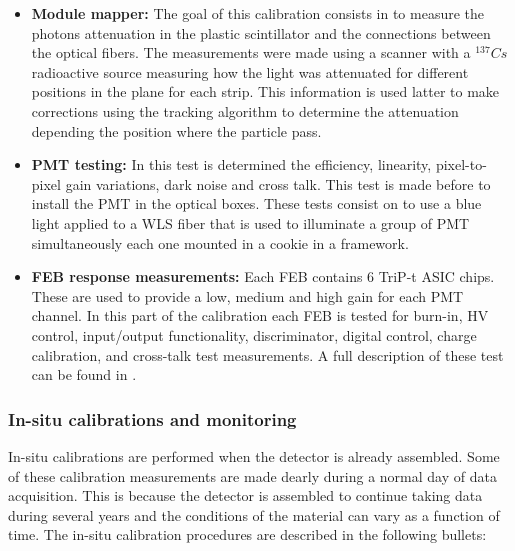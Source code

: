 \begin{itemize}
    \item \textbf{Module mapper:} The goal of this calibration consists in to measure the photons attenuation in the plastic scintillator and the connections between the optical fibers. The measurements were made using a scanner with a $^{137}Cs$ radioactive source measuring how the light was attenuated for different positions in the plane for each strip. This information is used latter to make corrections using the tracking algorithm to determine the attenuation depending the position where the particle pass.
    \item \textbf{PMT testing:} In this test is determined the efficiency, linearity, pixel-to-pixel gain variations, dark noise and cross talk. This test is made before to install the PMT in the optical boxes. These tests consist on to use a blue light applied to a WLS fiber that is used to illuminate a group of PMT simultaneously each one mounted in a cookie in a framework.
    \item \textbf{FEB response measurements:} Each FEB contains 6 TriP-t ASIC chips. These are used to provide a low, medium and high gain for each PMT channel. In this part of the calibration each FEB is tested for burn-in, HV control, input/output functionality, discriminator, digital control, charge calibration, and cross-talk test measurements. A full description of these test can be found in \cite{MINERvA}.    
\end{itemize}


\subsubsection{In-situ calibrations and monitoring}
\label{Cap:MnvExp:MnvDetector:Calibration:InSitu}

In-situ calibrations are performed when the detector is already assembled. Some of these calibration measurements are made dearly during a normal day of data acquisition. This is because the detector is assembled to continue taking data during several years and the conditions of the material can vary as a function of time. The in-situ calibration procedures are described in the following bullets:

